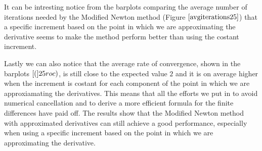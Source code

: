 It can be intresting notice from the barplots comparing the average number of iterations needed by the Modified Newton method (Figure $\eqref{avgiterations25}$) that a specific increment based on the point in which we are approximating the derivative seems to make the method perform better than using the costant increment.  

Lastly we can also notice that the average rate of convergence, shown in the barplots $\eqref(25roc)$, is still close to the expected value $2$ and it is on average higher when the increment is costant for each component of the point in which we are approxiamating the derivatives.
This means that all the efforts we put in to avoid numerical cancellation and to derive a more efficient formula for the finite differences have paid off. The results show that the Modified Newton method with approximated derivatives can still achieve a good performance, especially when using a specific increment based on the point in which we are approximating the derivative. 
